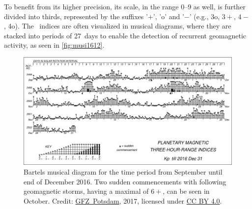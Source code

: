 To benefit from its higher precision, its scale, in the range 0--9 as well, is further divided into thirds, represented by the suffixes '$+$', 'o' and '$-$' (e.g., 3o, $3+$, $4-$, 4o). The \Kp{}~indices are often visualized in musical diagrams, where they are stacked into periods of 27~days to enable the detection of recurrent geomagnetic activity, as seen in \autoref{fig:musi1612}.
\begin{figure}[htb]
	\centering
	\includegraphics[width=\textwidth]{figures_of_others/images/musi1612.pdf}
	\caption[Credit: \href{http://www.gfz-potsdam.de/en/kp-index/}{GFZ~Potsdam}, 2017, licensed under \href{https://creativecommons.org/licenses/by/4.0/}{CC BY 4.0}.]
	{Bartels musical \Kp{} diagram for the time period from September until end of December 2016. Two sudden commencements with following geomagnetic storms, having a maximal \Kp{} of $6+$, can be seen in October. Credit: \href{http://www.gfz-potsdam.de/en/kp-index/}{GFZ~Potsdam}, 2017, licensed under \href{https://creativecommons.org/licenses/by/4.0/}{CC BY 4.0}.}
	\label{fig:musi1612}
\end{figure}

